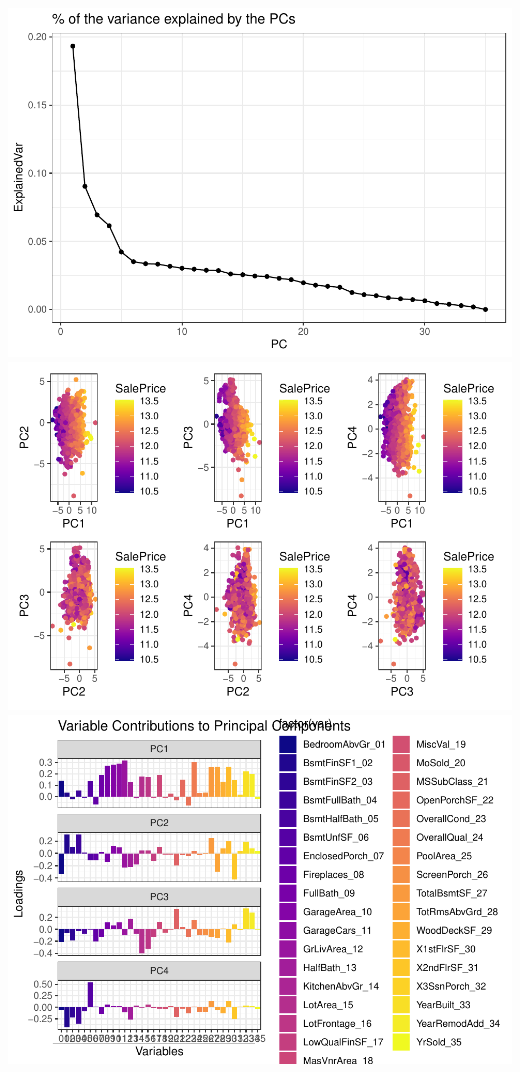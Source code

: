 \documentclass[
]{article}
\begin{document}
\includegraphics{report_files/figure-latex/dimensionality reduction-1.pdf}
\includegraphics{report_files/figure-latex/dimensionality reduction-2.pdf}
\includegraphics{report_files/figure-latex/dimensionality reduction-3.pdf}
\end{document}
